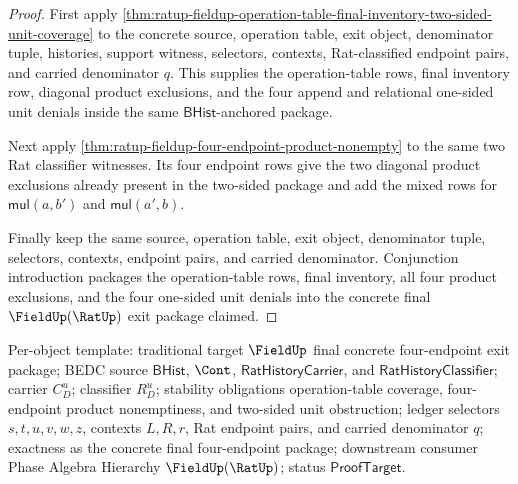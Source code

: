 \begin{proof}
First apply
\autoref{thm:ratup-fieldup-operation-table-final-inventory-two-sided-unit-coverage}
to the concrete source, operation table, exit object, denominator tuple,
histories, support witness, selectors, contexts, Rat-classified endpoint pairs,
and carried denominator $q$. This supplies the operation-table rows, final
inventory row, diagonal product exclusions, and the four append and relational
one-sided unit denials inside the same $\mathsf{BHist}$-anchored package.

Next apply \autoref{thm:ratup-fieldup-four-endpoint-product-nonempty} to the
same two Rat classifier witnesses. Its four endpoint rows give the two diagonal
product exclusions already present in the two-sided package and add the mixed
rows for $\mathsf{mul}(a,b')$ and $\mathsf{mul}(a',b)$.

Finally keep the same source, operation table, exit object, denominator tuple,
selectors, contexts, endpoint pairs, and carried denominator. Conjunction
introduction packages the operation-table rows, final inventory, all four
product exclusions, and the four one-sided unit denials into the concrete final
$\FieldUp(\RatUp)$ exit package claimed.
\end{proof}

Per-object template: traditional target $\FieldUp$ final concrete four-endpoint
exit package; BEDC source $\mathsf{BHist}$, $\Cont$,
$\mathsf{RatHistoryCarrier}$, and $\mathsf{RatHistoryClassifier}$; carrier
$C_D^u$; classifier $R_D^u$; stability obligations operation-table coverage,
four-endpoint product nonemptiness, and two-sided unit obstruction; ledger
selectors $s,t,u,v,w,z$, contexts $L,R,r$, Rat endpoint pairs, and carried
denominator $q$; exactness as the concrete final four-endpoint package;
downstream consumer Phase Algebra Hierarchy $\FieldUp(\RatUp)$; status
$\mathsf{ProofTarget}$.

